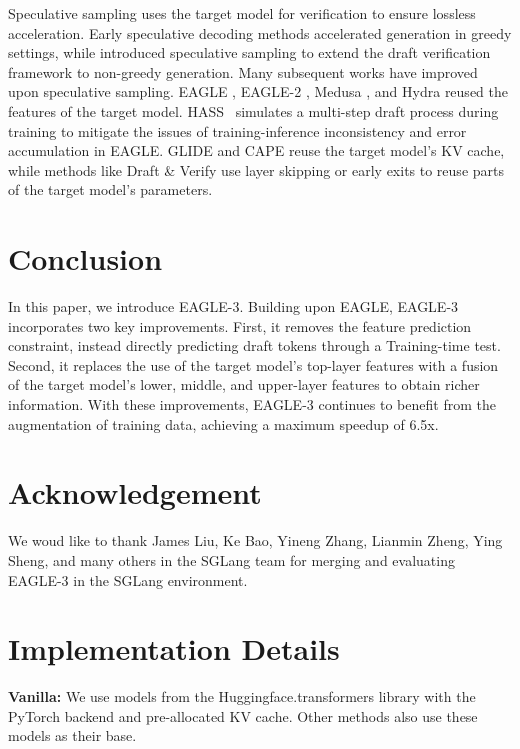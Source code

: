 \documentclass[11pt]{article}
\begin{document}
Speculative sampling uses the target model for verification to ensure lossless acceleration. Early speculative decoding methods \cite{stern2018blockwise, sun2021instantaneous} accelerated generation in greedy settings, while \citet{leviathan2023fast, chen2023accelerating} introduced speculative sampling to extend the draft verification framework to non-greedy generation. Many subsequent works have improved upon speculative sampling. EAGLE \cite{li2024eagle}, EAGLE-2 \cite{li2024eagle2}, Medusa \cite{cai2024medusa}, and Hydra \cite{ankner2024hydra} reused the features of the target model. HASS~\cite{zhang2024learning} simulates a multi-step draft process during training to mitigate the issues of training-inference inconsistency and error accumulation in EAGLE.
GLIDE and CAPE \cite{du2024glide} reuse the target model's KV cache, while methods \cite{hooper2023speed,yang2023predictive,monea2023pass,li2024nearest,yi2024generation,liu2024kangaroo,sun2024triforce,elhoushi2024layer,svirschevski2024specexec} like Draft \& Verify \cite{zhang2023draft} use layer skipping or early exits to reuse parts of the target model's parameters.

\section{Conclusion}

In this paper, we introduce EAGLE-3. Building upon EAGLE, EAGLE-3 incorporates two key improvements. First, it removes the feature prediction constraint, instead directly predicting draft tokens through a Training-time test. Second, it replaces the use of the target model's top-layer features with a fusion of the target model's lower, middle, and upper-layer features to obtain richer information. With these improvements, EAGLE-3 continues to benefit from the augmentation of training data, achieving a maximum speedup of 6.5x.

\section*{Acknowledgement}
We woud like to thank James Liu, Ke Bao, Yineng Zhang, Lianmin Zheng, Ying Sheng, and many others in the SGLang team for merging and evaluating EAGLE-3 in the SGLang environment.






\newpage
\clearpage
\appendix

\section{Implementation Details}
\label{sec:id}
\textbf{Vanilla:} We use models from the Huggingface.transformers library with the PyTorch backend and pre-allocated KV cache. Other methods also use these models as their base.
\end{document}
